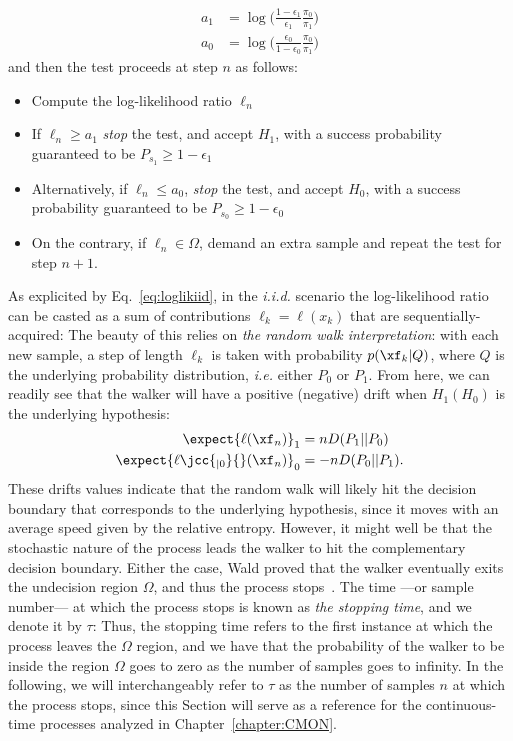 \begin{align}\label{eq:decisionsASPRT}
a_1 &= \log{ \Big(\frac{1-\epsilon_1}{\epsilon_1} \frac{\pi_0}{\pi_1} \Big)}\\
a_0 &= \log{\Big(\frac{\epsilon_0}{1-\epsilon_0}\frac{\pi_0}{\pi_1} \Big)}\nonumber
\end{align}
and then the test proceeds at step $n$ as follows:
\begin{itemize}
\item Compute the log-likelihood ratio $\ell_n$
\item If $\ell_n \geq a_1$ \textit{stop} the test, and accept $H_1$, with a success probability guaranteed to be $P_{s_1} \geq 1-\epsilon_1$
\item Alternatively, if $\ell_n \leq a_0$, \textit{stop} the test, and accept $H_0$, with a success probability guaranteed to be $P_{s_0}\geq 1-\epsilon_0$
\item On the contrary, if $\ell_n \in \Omega$, demand an extra sample and repeat the test for step $n+1$.
\end{itemize}

As explicited by Eq.~\ref{eq:loglikiid}, in the \textit{i.i.d.} scenario the log-likelihood ratio can be casted as a sum of contributions $\ell_k = \ell(x_k)$ that are sequentially-acquired:
The beauty of this relies on \textit{the random walk interpretation}: with each new sample, a step of length $\ell_k$ is taken with probability $p(\xf_k|Q)$, where $Q$ is the underlying probability distribution, \textit{i.e.} either $P_0$ or $P_1$. From here, we can readily see that the walker will have a positive (negative) drift when $H_1(H_0)$ is the underlying hypothesis:
\begin{align}
\expect{\ell(\xf_n)}_{1} &= n D(P_1||P_0) \\ \nonumber
\expect{\ell\jcc{_{|0}}{}(\xf_n)}_{0} &= -n D(P_0||P_1).
\end{align}
These drifts values indicate that the random walk will likely hit the decision boundary that corresponds to the underlying hypothesis, since it moves with an average speed given by the relative entropy. However, it might well be that the stochastic nature of the process leads the walker to hit the complementary decision boundary. Either the case, Wald proved that the walker eventually exits the undecision region $\Omega$, and thus the process stops~\cite{Wald1948Optimum}. The time ---or sample number--- at which the process stops is known as \textit{the stopping time}, and we denote it by $\tau$:
 Thus, the stopping time refers to the first instance at which the process leaves the $\Omega$ region, and we have that the probability of the walker to be inside the region $\Omega$ goes to zero as the number of samples goes to infinity. In the following, we will interchangeably refer to $\tau$ as the number of samples $n$ at which the process stops, since this Section will serve as a reference for the continuous-time processes analyzed in Chapter~\ref{chapter:CMON}.

